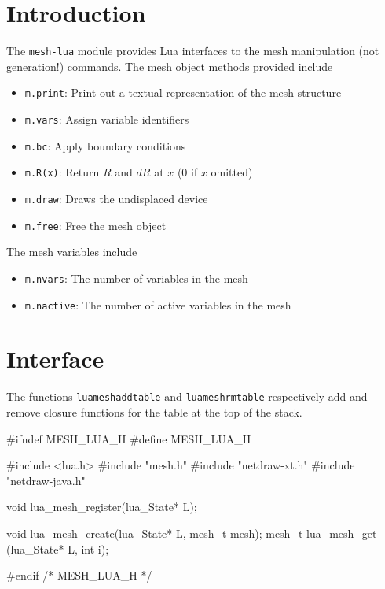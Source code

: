 
\section{Introduction}

The {\tt{}mesh-lua} module provides Lua interfaces to the mesh manipulation
(not generation!) commands.  The mesh object methods provided include
\begin{itemize}
  \item {\tt{}m.print}:   Print out a textual representation of the mesh structure
  \item {\tt{}m.vars}:    Assign variable identifiers
  \item {\tt{}m.bc}:      Apply boundary conditions
  \item {\tt{}m.R(x)}:    Return $R$ and $dR$ at $x$ (0 if $x$ omitted)
  \item {\tt{}m.draw}:    Draws the undisplaced device
  \item {\tt{}m.free}:    Free the mesh object
\end{itemize}
The mesh variables include
\begin{itemize}
  \item {\tt{}m.nvars}:   The number of variables in the mesh
  \item {\tt{}m.nactive}: The number of active variables in the mesh
\end{itemize}


\section{Interface}

The functions {\tt{}lua{}mesh{}add{}table} and {\tt{}lua{}mesh{}rm{}table}
respectively add and remove closure functions for the table at the
top of the stack.

\endmoddef
#ifndef MESH_LUA_H
#define MESH_LUA_H

#include <lua.h>
#include "mesh.h"
#include "netdraw-xt.h"
#include "netdraw-java.h"

void lua_mesh_register(lua_State* L);

void   lua_mesh_create(lua_State* L, mesh_t mesh);
mesh_t lua_mesh_get   (lua_State* L, int i);

#endif /* MESH_LUA_H */
\nwendcode{}\nwdocspar


